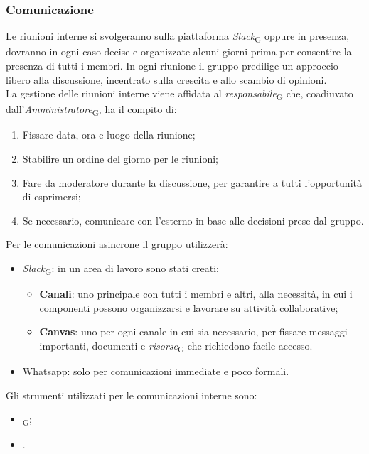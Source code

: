 \subsubsection{Comunicazione}
Le riunioni interne si svolgeranno sulla piattaforma \textit{Slack}\textsubscript{G} oppure in presenza, dovranno in ogni caso decise e organizzate alcuni giorni prima per consentire la presenza di tutti i membri. In ogni riunione il gruppo predilige un approccio libero alla discussione, incentrato sulla crescita e allo scambio di opinioni. \\
La gestione delle riunioni interne viene affidata al \textit{responsabile}\textsubscript{G} che, coadiuvato dall'\textit{Amministratore}\textsubscript{G}, ha il compito di:
\begin{enumerate}
    \item Fissare data, ora e luogo della riunione;
    \item Stabilire un ordine del giorno per le riunioni;
    \item Fare da moderatore durante la discussione, per garantire a tutti l'opportunità di esprimersi;
    \item Se necessario, comunicare con l'esterno in base alle decisioni prese dal gruppo.
\end{enumerate}
Per le comunicazioni asincrone il gruppo utilizzerà:
\begin{itemize}
    \item \textit{Slack}\textsubscript{G}: in un area di lavoro sono stati creati:
            \begin{itemize}
                \item \textbf{Canali}: uno principale con tutti i membri e altri, alla necessità, in cui i componenti possono organizzarsi e lavorare su attività collaborative;
                \item \textbf{Canvas}: uno per ogni canale in cui sia necessario, per fissare messaggi importanti, documenti e \textit{risorse}\textsubscript{G} che richiedono facile accesso.
            \end{itemize}
    \item Whatsapp: solo per comunicazioni immediate e poco formali.
\end{itemize}
Gli strumenti utilizzati per le comunicazioni interne sono:
\begin{itemize}
    \item \textit{}\textsubscript{G};
    \item {}.
\end{itemize}


